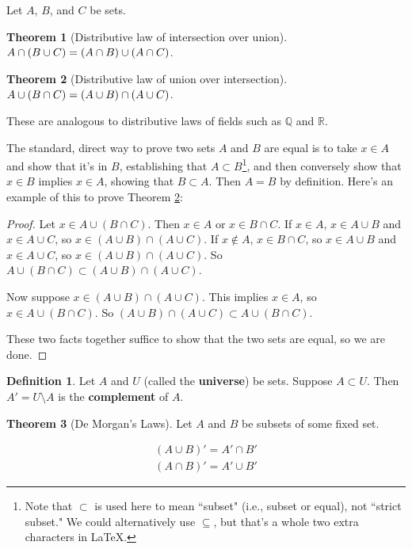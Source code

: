 \documentclass{article}
\theoremstyle{definition}
\newtheorem{definition}{Definition}[section]
\newtheorem{theorem}{Theorem}[section]
\begin{document}
Let $A$, $B$, and $C$ be sets.

\begin{theorem}[Distributive law of intersection over union]
$\\ A \cap (B \cup C) = (A \cap B) \cup (A \cap C)$.
\end{theorem}

\begin{theorem}[Distributive law of union over intersection] \label{distributive-law-2}
$\\ A \cup (B \cap C) = (A \cup B) \cap (A \cup C)$.
\end{theorem}

These are analogous to distributive laws of fields such as $\mathbb{Q}$ and $\mathbb{R}$.

The standard, direct way to prove two sets $A$ and $B$ are equal is to take $x \in A$ and show that it's in $B$, establishing that $A \subset B$\footnote{Note that $\subset$ is used here to mean ``subset" (i.e., subset or equal), not ``strict subset." We could alternatively use $\subseteq$, but that's a whole two extra characters in \LaTeX.}, and then conversely show that $x \in B$ implies $x \in A$, showing that $B \subset A$. Then $A = B$ by definition. Here's an example of this to prove Theorem \ref{distributive-law-2}:

\begin{proof}
Let $x \in A \cup (B \cap C)$. Then $x \in A$ or $x \in B \cap C$. If $x \in A$, $x \in A \cup B$ and $x \in A \cup C$, so $x \in (A \cup B) \cap (A \cup C)$. If $x \notin A$, $x \in B \cap C$, so $x \in A \cup B$ and $x \in A \cup C$, so $x \in (A \cup B) \cap (A \cup C)$. So $A \cup (B \cap C) \subset (A \cup B) \cap (A \cup C)$.

Now suppose $x \in (A \cup B) \cap (A \cup C)$. This implies $x \in A$, so $x \in A \cup (B \cap C)$. So $(A \cup B) \cap (A \cup C) \subset A \cup (B \cap C)$.

These two facts together suffice to show that the two sets are equal, so we are done.
\end{proof} 

\begin{definition}
Let $A$ and $U$ (called the \textbf{universe}) be sets. Suppose $A \subset U$. Then $A' = U \setminus A$ is the \textbf{complement} of $A$.
\end{definition}

\begin{theorem}[De Morgan's Laws]
Let $A$ and $B$ be subsets of some fixed set.

\begin{align*}
(A \cup B)' = A' \cap B' \\
(A \cap B)' = A' \cup B'
\end{align*}
\end{theorem}
\end{document}
